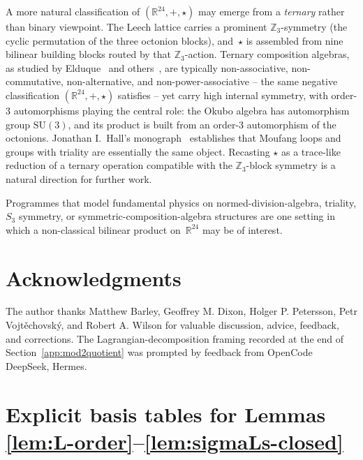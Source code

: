 \documentclass[twoside,english]{paper}
\numberwithin{equation}{section}
\numberwithin{figure}{section}
\theoremstyle{definition}
\theoremstyle{remark}
\newcommand{\RR}{\mathbb{R}}
\newcommand{\ZZ}{\mathbb{Z}}
\begin{document}
A more natural classification of $(\RR^{24}, +, \star)$ may emerge
from a \emph{ternary} rather than binary viewpoint.  The Leech lattice
carries a prominent $\ZZ_3$-symmetry (the cyclic permutation of the
three octonion blocks), and~$\star$ is assembled from nine bilinear
building blocks routed by that $\ZZ_3$-action.  Ternary composition
algebras, as studied by
Elduque~\cite{Elduque1996,Elduque2000_Triality,Elduque2023_IsotropicNorm}
and others~\cite{SmithVojtechovsky2022,KamiyaOkubo2015,Okubo1995_Book},
are typically non-associative, non-commutative, non-alternative, and
non-power-associative -- the same negative classification $(\RR^{24},
+, \star)$ satisfies -- yet carry high internal symmetry, with
order-3 automorphisms playing the central role: the Okubo algebra has
automorphism group $\mathrm{SU}(3)$, and its product is built from an
order-3 automorphism of the octonions.  Jonathan I.~Hall's
monograph~\cite{Hall2019_Moufang} establishes that Moufang loops and
groups with triality are essentially the same object.  Recasting
$\star$ as a trace-like reduction of a ternary operation compatible
with the $\ZZ_3$-block symmetry is a natural direction for further
work.

Programmes that model fundamental physics on normed-division-algebra,
triality, $S_3$ symmetry, or symmetric-composition-algebra structures
\cite{GresnigtGourlayVarma2023, Koeplinger2023,
FureyHughes2025_TrioOfTrialities, MarraniCorradettiZucconi2025}
are one setting in which a non-classical bilinear product on~$\RR^{24}$
may be of interest.

\section*{Acknowledgments}

The author thanks Matthew Barley, Geoffrey M. Dixon, Holger P.
Petersson, Petr Vojt\v{e}chovsk\'{y}, and Robert A. Wilson for
valuable discussion, advice, feedback, and corrections.  The Lagrangian-decomposition
framing recorded at the end of
Section~\ref{app:mod2quotient} was prompted by feedback from
OpenCode DeepSeek, Hermes.

\appendix
\section{Explicit basis tables for Lemmas
\ref{lem:L-order}--\ref{lem:sigmaLs-closed}}\label{sec:appendix-tables}
\end{document}
